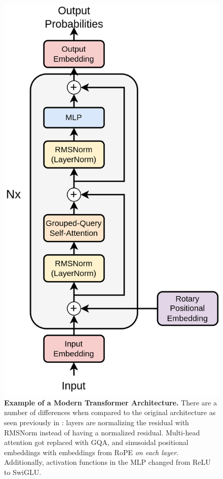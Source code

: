 \begin{figure}[!htbp]
    \begin{centering}
        \includegraphics[height=0.8\textheight]{img/modern_transformer}
        \caption[Example of a Modern Transformer Architecture]{\textbf{Example of a Modern Transformer Architecture.} There are a number of differences when compared to the original architecture as seen previously in : layers are normalizing the residual with RMSNorm instead of having a normalized residual. Multi-head attention got replaced with \gls{GQA}, and sinusoidal positional embeddings with embeddings from \gls{RoPE} {\em on each layer}. Additionally, activation functions in the \gls{MLP} changed from \gls{ReLU} to \gls{SwiGLU}.}
        \label{fig:modern_transformer}
    \end{centering}
\end{figure}

